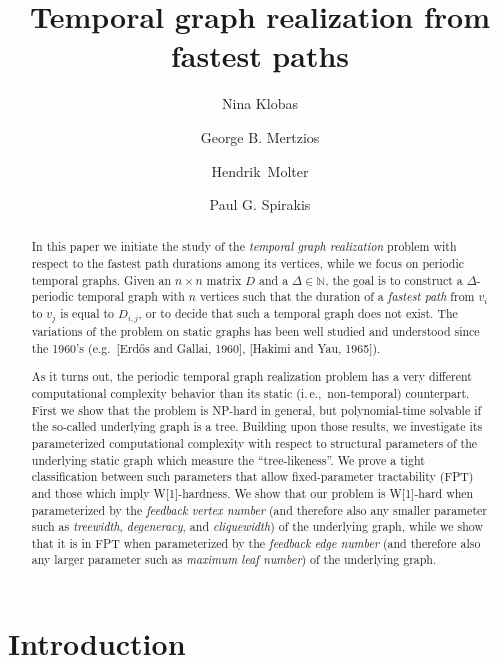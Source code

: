 \documentclass[a4paper,UKenglish,cleveref, autoref, thm-restate]{lipics-v2021}
\title{Temporal graph realization from fastest paths} %
\author{Nina Klobas}{Department of Computer Science, Durham University, UK}{nina.klobas@durham.ac.uk}{ https://orcid.org/0000-0002-8024-5782}{}
\author{George B. Mertzios}{Department of Computer Science, Durham University, UK}{george.mertzios@durham.ac.uk}{https://orcid.org/0000-0001-7182-585X}{Supported by the EPSRC grant EP/P020372/1.}
\author{Hendrik~Molter}{Department of Computer Science, Ben-Gurion~University~of~the~Negev, Beer-Sheva, Israel}{molterh@post.bgu.ac.il}{https://orcid.org/0000-0002-4590-798X}{Supported by the ISF, grant No.~1456/18, and the ERC, grant number 949707.}
\author{Paul G. Spirakis}{Department of Computer Science, University of Liverpool, UK}{p.spirakis@liverpool.ac.uk}{https://orcid.org/0000-0001-5396-3749}{Supported by the EPSRC grant EP/P02002X/1.}
\newcommand{\ie}{i.\,e.,\ }
\begin{document}
\maketitle

\begin{abstract}
In this paper we initiate the study of the \emph{temporal graph realization} problem with respect to the fastest path durations among its vertices, 
while we focus on periodic temporal graphs. 
Given an $n \times n$ matrix $D$ and a $\Delta \in \mathbb{N}$, the goal is to construct a $\Delta$-periodic temporal graph with $n$ vertices 
such that the duration of a \emph{fastest path} from $v_i$ to $v_j$ is equal to $D_{i,j}$, or to decide that such a temporal graph does not exist. 
The variations of the problem on static graphs has been well studied and understood since the 1960's (e.g.\ [Erd\H{o}s and Gallai, 1960], [Hakimi and Yau, 1965]).

As it turns out, the periodic temporal graph realization problem has a very different computational complexity behavior than its static (\ie non-temporal) counterpart. 
First we show that the problem is NP-hard in general, but polynomial-time solvable if the so-called underlying graph is a tree.
Building upon those results, we investigate its parameterized computational complexity with respect to structural parameters of the underlying static graph which measure the ``tree-likeness''. We prove a tight classification between such parameters that allow fixed-parameter tractability (FPT) 
and those which imply W[1]-hardness. 
We show that our problem is W[1]-hard when parameterized by the \emph{feedback vertex number} (and therefore also any smaller parameter such as \emph{treewidth}, \emph{degeneracy}, and \emph{cliquewidth}) of the underlying graph, while we show that it is in FPT when parameterized by the \emph{feedback edge number} (and therefore also any larger parameter such as \emph{maximum leaf number}) of the underlying graph. 





\end{abstract}


\section{Introduction}\label{intro-sec}
\end{document}
